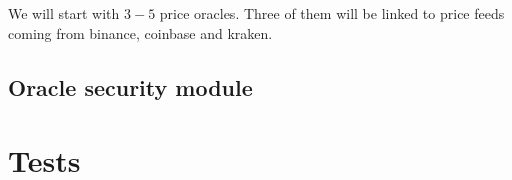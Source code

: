 \documentclass{article} %
\begin{document}
We will start with $3-5$ price oracles.
Three of them will be linked to price feeds coming from binance, coinbase and
kraken.

\subsection{Oracle security module}

\section{Tests}


% 
\end{document}
